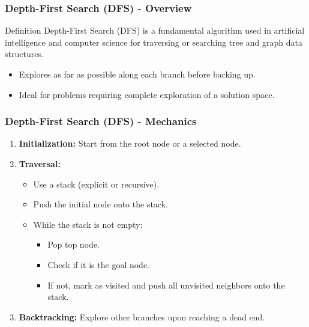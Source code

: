 \documentclass[aspectratio=169]{beamer}
\begin{document}
\begin{frame}[fragile]
    \frametitle{Depth-First Search (DFS) - Overview}
    \begin{block}{Definition}
        Depth-First Search (DFS) is a fundamental algorithm used in artificial intelligence and computer science for traversing or searching tree and graph data structures.
    \end{block}
    \begin{itemize}
        \item Explores as far as possible along each branch before backing up.
        \item Ideal for problems requiring complete exploration of a solution space.
    \end{itemize}
\end{frame}

\begin{frame}[fragile]
    \frametitle{Depth-First Search (DFS) - Mechanics}
    \begin{enumerate}
        \item \textbf{Initialization:} Start from the root node or a selected node.
        \item \textbf{Traversal:} 
            \begin{itemize}
                \item Use a stack (explicit or recursive).
                \item Push the initial node onto the stack.
                \item While the stack is not empty:
                    \begin{itemize}
                        \item Pop top node.
                        \item Check if it is the goal node.
                        \item If not, mark as visited and push all unvisited neighbors onto the stack.
                    \end{itemize}
            \end{itemize}
        \item \textbf{Backtracking:} Explore other branches upon reaching a dead end.
    \end{enumerate}
\end{frame}
\end{document}
